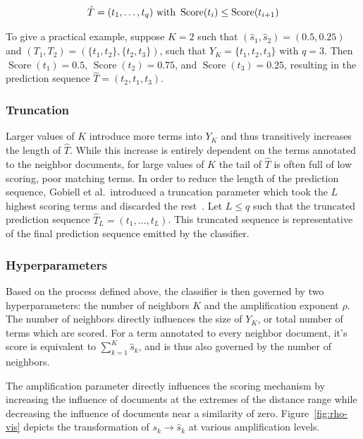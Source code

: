 \documentclass[11pt]{article}
\theoremstyle{plain}
\theoremstyle{definition}
\begin{document}
\begin{equation}\label{eq:pred-sequence}
    \hat{T} = (t_1, \dots, t_q) \textnormal{ with } \operatorname{Score}(t_i) \leq \operatorname{Score}(t_{i+1})
\end{equation}

To give a practical example, suppose $K=2$ such that $(\hat{s}_1, \hat{s}_2) = (0.5, 0.25)$ and $(T_1, T_2) = (\{t_1, t_2\},\{t_2, t_3\})$,  such that $Y_K = \{t_1, t_2, t_3\}$ with $q=3$. Then $\operatorname{Score}(t_1) = 0.5$, $\operatorname{Score}(t_2) = 0.75$, and $\operatorname{Score}(t_3) = 0.25$, resulting in the prediction sequence $\hat{T} = (t_2, t_1, t_3)$.

\subsubsection{Truncation}\label{sec:methods-scoring-truncation}

Larger values of $K$ introduce more terms into $Y_K$ and thus transitively increases the length of $\hat{T}$. While this increase is entirely dependent on the terms annotated to the neighbor documents, for large values of $K$ the tail of $\hat{T}$ is often full of low scoring, poor matching terms. In order to reduce the length of the prediction sequence, Gobiell et al.\ introduced a truncation parameter which took the $L$ highest scoring terms and discarded the rest~\cite{gobeill/2013/managing}. Let $L \leq q$ such that the truncated prediction sequence $\hat{T}_L = (t_1, \dots, t_L)$. This truncated sequence is representative of the final prediction sequence emitted by the classifier.

\subsubsection{Hyperparameters}\label{sec:methods-scoring-hyperparameters}

Based on the process defined above, the classifier is then governed by two hyperparameters: the number of neighbors $K$ and the amplification exponent $\rho$. The number of neighbors directly influences the size of $Y_K$, or total number of terms which are scored. For a term annotated to every neighbor document, it's score is equivalent to $\sum_{k=1}^K \hat{s}_k$, and is thus also governed by the number of neighbors.

The amplification parameter directly influences the scoring mechanism by increasing the influence of documents at the extremes of the distance range while decreasing the influence of documents near a similarity of zero. Figure~\ref{fig:rho-vis} depicts the transformation of $s_k \rightarrow \hat{s}_k$ at various amplification levels.
\end{document}
